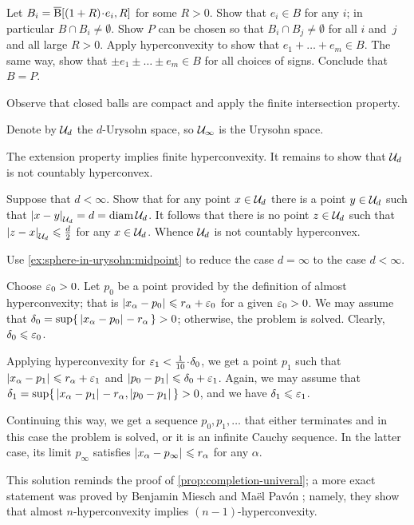 Let $B_i=\cBall[(1+R)\cdot e_i,R]$ for some $R>0$.
Show that $ e_i\in B$ for any $i$; in particular $B\cap B_i\ne\emptyset$.
Show $P$ can be chosen so that $B_i\cap B_j\ne \emptyset$ for all $i$ and~$j$ and all large $R>0$.
Apply hyperconvexity to show that $e_1+\dots+ e_m\in B$.
The same way, show that $\pm e_1\pm \dots\pm e_m\in B$ for all choices of signs.
Conclude that $B=P$.

Observe that closed balls are compact and
apply the finite intersection property.

Denote by $\mathcal{U}_d$ the $d$-Urysohn space,
so $\mathcal{U}_\infty$ is the Urysohn space.

The extension property implies finite hyperconvexity.
It remains to show that $\mathcal{U}_d$ is not countably hyperconvex.

Suppose that $d<\infty$. 
Show that for any point $x\in\mathcal{U}_d$ there is a point $y\in\mathcal{U}_d$ such that $\dist{x}{y}{\spc{U}_d}=d=\diam\spc{U}_d$.
It follows that there is no point $z\in\mathcal{U}_d$ such that $\dist{z}{x}{\spc{U}_d}\le \tfrac d2$ for any $x\in\mathcal{U}_d$.
Whence $\mathcal{U}_d$ is not countably hyperconvex.

Use \ref{ex:sphere-in-urysohn:midpoint} to reduce the case $d=\infty$ to the case $d<\infty$.

Choose $\varepsilon_0>0$.
Let $p_0$ be a point provided by the definition of almost hyperconvexity;
that is $\dist{x_\alpha}{p_0}{}\le r_\alpha+\eps_0$ for a given $\varepsilon_0>0$.
We may assume that $\delta_0=\sup\{\,\dist{x_\alpha}{p_0}{}- r_\alpha\,\}>0$; otherwise, the problem is solved.
Clearly, $\delta_0\leqslant \varepsilon_0$.

Applying hyperconvexity for $\eps_1<\tfrac1{10}\cdot\delta_0$,
we get a point 
$p_1$ such that $\dist{x_\alpha}{p_1}{}\le r_\alpha+\eps_1$ and $\dist{p_0}{p_1}{}\le \delta_0+\eps_1$.
Again, we may assume that $\delta_1=\sup\{\,\dist{x_\alpha}{p_1}{}- r_\alpha,\dist{p_0}{p_1}{}\,\}>0$, and we have $\delta_1\leqslant \varepsilon_1$.

Continuing this way, we get a sequence $p_0,p_1,\dots$ that either terminates and in this case the problem is solved, or it is an infinite Cauchy sequence.
In the latter case, its limit $p_\infty$ satisfies $\dist{x_\alpha}{p_\infty}{}\le r_\alpha$ for any $\alpha$.

This solution reminds the proof of \ref{prop:completion-univeral};
a more exact statement was proved by Benjamin Miesch and Maël Pavón \cite[2.2]{miesch-pavon2016};
namely, they show that almost $n$-hyperconvexity implies $(n-1)$-hyperconvexity.


